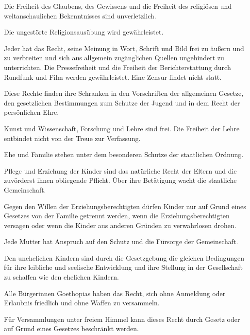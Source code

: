 \documentclass{sasbase}
\begin{document}
\begin{article}[Religionsfreiheit]
	\item Die Freiheit des Glaubens, des Gewissens und die Freiheit des religiösen und weltanschaulichen Bekenntnisses sind unverletzlich.	
	\item Die ungestörte Religionsausübung wird gewährleistet.
\end{article}

\begin{article}[Meinungsfreiheit]
	\item Jeder hat das Recht, seine Meinung in Wort, Schrift und Bild frei zu äußern und zu verbreiten und sich aus allgemein zugänglichen Quellen ungehindert zu unterrichten. Die Pressefreiheit und die Freiheit der Berichterstattung durch Rundfunk und Film werden gewährleistet. Eine Zensur findet nicht statt.
	\item Diese Rechte finden ihre Schranken in den Vorschriften der allgemeinen Gesetze, den gesetzlichen Bestimmungen zum Schutze der Jugend und in dem Recht der persönlichen Ehre.
	\item Kunst und Wissenschaft, Forschung und Lehre sind frei. Die Freiheit der Lehre entbindet nicht von der Treue zur Verfassung.
\end{article}

\begin{article}
	\item Ehe und Familie stehen unter dem besonderen Schutze der staatlichen Ordnung.
	\item Pflege und Erziehung der Kinder sind das natürliche Recht der Eltern und die zuvörderst ihnen obliegende Pflicht. Über ihre Betätigung wacht die staatliche Gemeinschaft.
	\item Gegen den Willen der Erziehungsberechtigten dürfen Kinder nur auf Grund eines Gesetzes von der Familie getrennt werden, wenn die Erziehungsberechtigten versagen oder wenn die Kinder aus anderen Gründen zu verwahrlosen drohen.
	\item Jede Mutter hat Anspruch auf den Schutz und die Fürsorge der Gemeinschaft.
	\item Den unehelichen Kindern sind durch die Gesetzgebung die gleichen Bedingungen für ihre leibliche und seelische Entwicklung und ihre Stellung in der Gesellschaft zu schaffen wie den ehelichen Kindern.
\end{article}

\begin{article}[Versammlungsfreiheit]
	\item Alle B\"{u}rgerinnen Goethopias haben das Recht, sich ohne Anmeldung oder Erlaubnis friedlich und ohne Waffen zu versammeln.
	\item Für Versammlungen unter freiem Himmel kann dieses Recht durch Gesetz oder auf Grund eines Gesetzes beschränkt werden.
\end{article}
\end{document}
